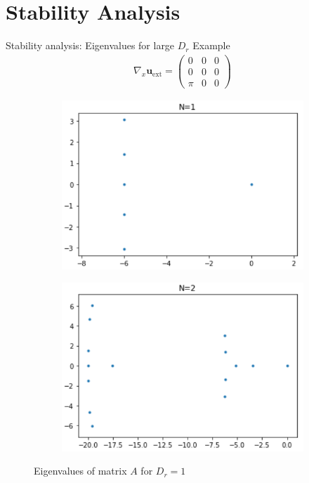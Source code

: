 \section{Stability Analysis}

\begin{frame}{Stability analysis: Eigenvalues for large $D_r$}
	\scriptsize
	Example
	\begin{align*}
		\nabla_{x} \boldsymbol{u}_{\mathrm{ext}}=\left(\begin{array}{ccc}
			0 & 0 & 0 \\
			0 & 0 & 0 \\
			\pi & 0 & 0
		\end{array}\right)
	\end{align*}

\begin{figure}
	\begin{subfigure}{0.48\textwidth}
		\includegraphics[width=\linewidth]{Bilder_wx/Stability/Ew_2nd_dr=1_dt=1}
	\end{subfigure}
	\hfill
	\begin{subfigure}{0.48\textwidth}
		\includegraphics[width=\linewidth]{Bilder_wx/Stability/Ew_4th_dr=1_dt=1}
	\end{subfigure}
	\caption{Eigenvalues of matrix $A$ for $D_r = 1$}
\end{figure}
\end{frame}

